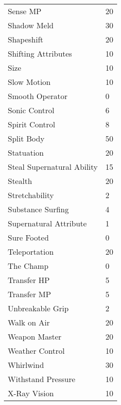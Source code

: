 \documentclass[twoside]{book}
\begin{document}
\begin{longtable}{p{1.25in}l}
      \raggedright Sense MP & 20 \tabularnewline
      \raggedright Shadow Meld & 30 \tabularnewline
      \raggedright Shapeshift & 20 \tabularnewline
      \raggedright Shifting Attributes & 10 \tabularnewline
      \raggedright Size & 10 \tabularnewline
      \raggedright Slow Motion & 10 \tabularnewline
      \raggedright Smooth Operator & 0 \tabularnewline
      \raggedright Sonic Control & 6 \tabularnewline
      \raggedright Spirit Control & 8 \tabularnewline
      \raggedright Split Body & 50 \tabularnewline
      \raggedright Statuation & 20 \tabularnewline
      \raggedright Steal Supernatural Ability
           & 15 \tabularnewline
      \raggedright Stealth & 20 \tabularnewline
      \raggedright Stretchability & 2 \tabularnewline
      \raggedright Substance Surfing & 4 \tabularnewline
      \raggedright Supernatural Attribute & 1 \tabularnewline
      \raggedright Sure Footed & 0 \tabularnewline
      \raggedright Teleportation & 20 \tabularnewline
      \raggedright The Champ & 0 \tabularnewline
      \raggedright Transfer HP & 5 \tabularnewline
      \raggedright Transfer MP & 5 \tabularnewline
      \raggedright Unbreakable Grip & 2 \tabularnewline
      \raggedright Walk on Air & 20 \tabularnewline
      \raggedright Weapon Master & 20 \tabularnewline
      \raggedright Weather Control & 10 \tabularnewline
      \raggedright Whirlwind & 30 \tabularnewline
      \raggedright Withstand Pressure & 10 \tabularnewline
      \raggedright X-Ray Vision & 10 \tabularnewline
      
\end{longtable}
    
\end{document}
